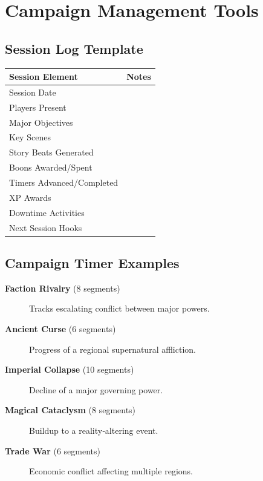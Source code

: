 \newpage
\section{Campaign Management Tools}\label{sec:campaign_tools}

\subsection{Session Log Template}\label{subsec:session_log_template}
\begin{center}
\feTableStart
\begin{tabularx}{\linewidth}{@{}p{4cm} Y@{}}
\toprule
\textbf{Session Element} & \textbf{Notes} \\
\midrule
Session Date & \\
Players Present & \\
Major Objectives & \\
Key Scenes & \\
Story Beats Generated & \\
Boons Awarded/Spent & \\
Timers Advanced/Completed & \\
XP Awards & \\
Downtime Activities & \\
Next Session Hooks & \\
\bottomrule
\end{tabularx}
\feTableEnd
\end{center}

\subsection{Campaign Timer Examples}\label{subsec:campaign_timers}
\begin{description}
    \item[\textbf{Faction Rivalry} (8 segments)] Tracks escalating conflict between major powers.
    \item[\textbf{Ancient Curse} (6 segments)] Progress of a regional supernatural affliction.
    \item[\textbf{Imperial Collapse} (10 segments)] Decline of a major governing power.
    \item[\textbf{Magical Cataclysm} (8 segments)] Buildup to a reality‑altering event.
    \item[\textbf{Trade War} (6 segments)] Economic conflict affecting multiple regions.
\end{description}

